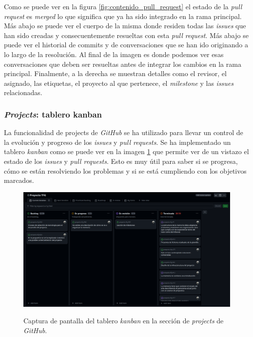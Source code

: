 Como se puede ver en la figura \ref{fig:contenido_pull_request} el estado de la \textit{pull request} es \textit{merged} lo que significa que ya ha sido integrado en la rama principal. Más abajo se puede ver el cuerpo de la misma donde residen todas las \textit{issues} que han sido creadas y consecuentemente resueltas con esta \textit{pull request}. Más abajo se puede ver el historial de commits y de conversaciones que se han ido originando a lo largo de la resolución. Al final de la imagen es donde podemos ver esas conversaciones que deben ser resueltas antes de integrar los cambios en la rama principal. Finalmente, a la derecha se muestran detalles como el revisor, el asignado, las etiquetas, el proyecto al que pertenece, el \textit{milestone} y las \textit{issues} relacionadas.

\subsubsection{\textit{Projects}: tablero kanban}

La funcionalidad de projects de \textit{GitHub} se ha utilizado para llevar un control de la evolución y progreso de los \textit{issues} y \textit{pull requests}. Se ha implementado un tablero \textit{kanban} como se puede ver en la imagen \ref{fig:tablero_kanban} que permite ver de un vistazo el estado de los \textit{issues} y \textit{pull requests}. Esto es muy útil para saber si se progresa, cómo se están resolviendo los problemas y si se está cumpliendo con los objetivos marcados.

\begin{figure}[H]
    \caption{Captura de pantalla del tablero \textit{kanban} en la sección de \textit{projects} de \textit{GitHub}.}
    \centering
    \vspace*{0.5cm}
    \includegraphics[scale=0.2]{figuras/projects_github.png}
    \label{fig:tablero_kanban}
\end{figure}

